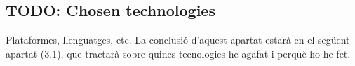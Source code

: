 
\subsection{TODO: Chosen technologies}

Plataformes, llenguatges, etc. La conclusió d'aquest apartat estarà en el
següent apartat (3.1), que tractarà sobre quines tecnologies he agafat i perquè
ho he fet.
